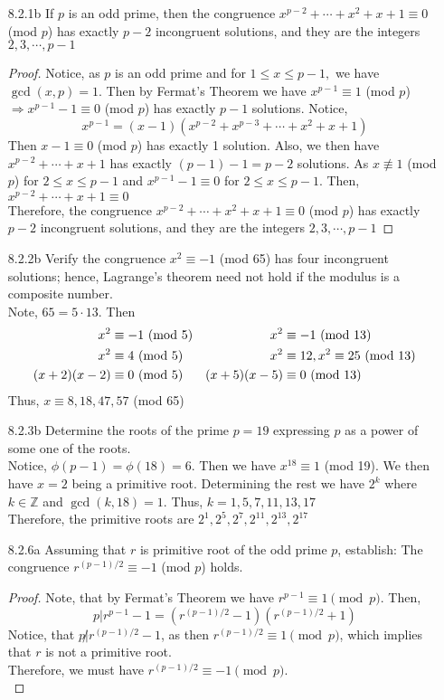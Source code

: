 \documentclass[12pt]{article}
\newcommand{\Z}{\mathds{Z}}
\begin{document}
\begin{enumerate}
	\item[8.2.1b]If $ p $ is an odd prime, then the congruence $ x^{p-2}+\cdots+x^2+x+1\equiv0 $ (mod $ p $) has exactly $ p-2 $ incongruent solutions, and they are the integers $ 2,3,\cdots,p-1 $
	\begin{proof}
		Notice, as $ p $ is an odd prime and for $ 1 \leq x \leq p-1,$ we have $ \gcd(x,p)=1 $. Then by Fermat's Theorem we have $ x^{p-1}\equiv 1 $ (mod $ p $) $ \Rightarrow x^{p-1}-1\equiv0$ (mod $ p $) has exactly $ p-1 $ solutions. Notice, 
			\[x^{p-1}=(x-1)(x^{p-2}+x^{p-3}+\cdots+x^2+x+1)\]
		Then $ x-1\equiv0 $ (mod $ p $) has exactly 1 solution. Also, we then have $ x^{p-2}+\cdots+x+1 $ has exactly $ (p-1)-1=p-2 $ solutions. As $ x\not\equiv1 $ (mod $ p $) for $ 2 \leq x \leq p-1  $ and $ x^{p-1}-1\equiv0 $ for $ 2 \leq x \leq p-1 $. Then, $ x^{p-2}+\cdots+x+1\equiv0 $\\
		Therefore, the congruence $ x^{p-2}+\cdots+x^2+x+1\equiv0 $ (mod $ p $) has exactly $ p-2 $ incongruent solutions, and they are the integers $ 2,3,\cdots,p-1$
	\end{proof}
	
	\item[8.2.2b] Verify the congruence $ x^2\equiv-1 $ (mod 65) has four incongruent solutions; hence, Lagrange's theorem need not hold if the modulus is a composite number.\\
		Note, $ 65 = 5\cdot13 $. Then
		\begin{align*}
			x^2 &\equiv -1 \text{ (mod $5$)} & x^2 &\equiv -1 \text{ (mod $ 13 $)} \\
			x^2 &\equiv 4 \text{ (mod $5$)} & x^2 &\equiv 12, x^2 \equiv 25 \text{ (mod $ 13 $)} \\
			(x+2)(x-2)&\equiv 0\text{ (mod $5$)} & (x+5)(x-5)&\equiv 0 \text{ (mod $13$)} 
		\end{align*}
		Thus, $ x \equiv 8,18,47,57 $ (mod 65)
	\item[8.2.3b] Determine the roots of the prime $ p = 19 $ expressing $p$ as a power of some one of the roots.\\
	Notice, $ \phi(p-1)=\phi(18)=6 $. Then we have $ x^{18} \equiv 1 $ (mod 19). We then have $ x=2 $ being a primitive root. Determining the rest we have $ 2^k $ where $ k\in\Z $ and $\gcd(k,18)=1 $. Thus, $ k =1,5,7,11,13,17 $\\
	Therefore, the primitive roots are $ 2^1, 2^5,2^7,2^{11},2^{13},2^{17} $
	
	\item[8.2.6a] Assuming that $ r $ is primitive root of the odd prime $ p $, establish: The congruence $ r^{(p-1)/2}\equiv-1 $ (mod $ p $) holds.
	\begin{proof}
		Note, that by Fermat's Theorem we have $ r^{p-1} \equiv 1 \pmod{p} $. Then, \[ p|r^{p-1}-1=(r^{(p-1)/2}-1)(r^{(p-1)/2}+1)\]
		Notice, that $ p\not| r^{(p-1)/2}-1 $, as then $ r^{(p-1)/2}\equiv 1 \pmod p $, which implies that $ r $ is not a primitive root. \\
		Therefore, we must have $ r^{(p-1)/2} \equiv -1 \pmod p $.\\
	\end{proof}
\end{enumerate}
\end{document}
